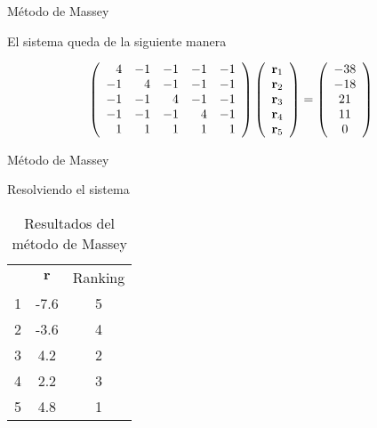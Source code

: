 \documentclass[10pt,hyperref={unicode}]{beamer}
\begin{document}
	\begin{frame}{Método de Massey}
		
		\begin{ejemplo}[continuación]
			El sistema queda de la siguiente manera
			
			\begin{equation*}
			\left(\begin{array}{r r r r r}
			4  & -1 & -1 & -1 & -1\\
			-1 &  4 & -1 & -1 & -1\\
			-1 & -1 &  4 & -1 & -1\\
			-1 & -1 & -1 &  4 & -1\\
			1 &  1 &  1 &  1 &  1 
			\end{array}\right)
			\left(\begin{array}{c}
			\mathbf{r}_1\\
			\mathbf{r}_2\\
			\mathbf{r}_3\\
			\mathbf{r}_4\\
			\mathbf{r}_5
			\end{array}\right)
			=
			\left(\begin{array}{c}
			-38\\
			-18\\
			21\\
			11\\
			0
			\end{array}\right)
			\end{equation*}
					
		\end{ejemplo}
		
	\end{frame}
	
		\begin{frame}{Método de Massey}
			
			\begin{ejemplo}[continuación]
				Resolviendo el sistema
				
				\begin{table}[h]
					\centering
					\caption{Resultados del método de Massey}
					\label{tbl:massey_resultados}
					\begin{tabular}{@{}ccc@{}}
						\cmidrule(l){2-3}
						& $\mathbf{r}$ & Ranking \\ \cmidrule(l){2-3} 
						1 & -7.6         & 5       \\ \midrule
						2 & -3.6         & 4       \\ \midrule
						3 & 4.2          & 2       \\ \midrule
						4 & 2.2          & 3       \\ \midrule
						5 & 4.8          & 1       \\ \bottomrule
					\end{tabular}
				\end{table}
				
				
			\end{ejemplo}
			
	\end{frame}
	
\end{document}

